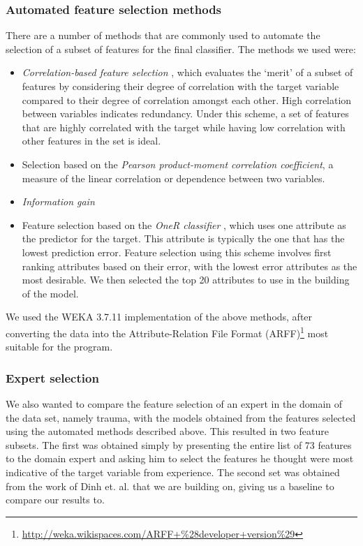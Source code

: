 \subsubsection{Automated feature selection methods}
There are a number of methods that are commonly used to automate the selection
of a subset of features for the final classifier. The methods we used were:
\begin{itemize}
\item \textit{Correlation-based feature selection} \citep{Hall2000},
which evaluates the `merit' of a
subset of features by considering their degree of correlation with the target
variable compared to their degree of correlation amongst each other. High
correlation between variables indicates redundancy. Under
this scheme, a set of features that are highly correlated with the target
while having low correlation with other features in the set is ideal.
\item Selection based on the
\textit{Pearson product-moment correlation coefficient}, a measure of the
linear correlation or dependence between two variables.
\item \textit{Information gain} 
\item Feature selection based on the \textit{OneR classifier}
\citep{Holte1993}, which uses one
attribute as the predictor for the target. This attribute is typically the one
that has the lowest prediction error. Feature selection using this scheme
involves first ranking attributes based on their error, with the lowest error
attributes as the most desirable. We then selected the top 20 attributes to
use in the building of the model.
\end{itemize}

We used the WEKA 3.7.11 \citep{Hall2009} implementation of the above
methods, after converting the data into the Attribute-Relation File Format
(ARFF)\footnote{\url{http://weka.wikispaces.com/ARFF+\%28developer+version\%29}}
most suitable for the program.

\subsubsection{Expert selection}
We also wanted to compare the feature selection of an expert in the domain
of the data set, namely trauma, with the models obtained from the features
selected using the automated methods described above. This resulted in two
feature subsets. The first was obtained simply by presenting the entire list
of 73 features to the domain expert and asking him to select the features he
thought were most indicative of the target variable from experience. The
second set was obtained from the work of Dinh et. al. \citep{Dinh2013a} that
we are building on, giving us a baseline to compare our results to.

